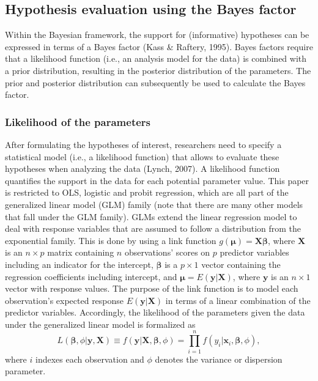 \documentclass[
]{interact}
\begin{document}
\hypertarget{hypothesis-evaluation-using-the-bayes-factor}{%
  \subsection{Hypothesis evaluation using the Bayes
    factor}\label{hypothesis-evaluation-using-the-bayes-factor}}

Within the Bayesian framework, the support for (informative) hypotheses
can be expressed in terms of a Bayes factor (Kass \& Raftery, 1995).
Bayes factors require that a likelihood function (i.e., an analysis
                                                  model for the data) is combined with a prior distribution, resulting in
the posterior distribution of the parameters. The prior and posterior
distribution can subsequently be used to calculate the Bayes factor.

\hypertarget{likelihood-of-the-parameters}{%
  \subsubsection{Likelihood of the
    parameters}\label{likelihood-of-the-parameters}}

After formulating the hypotheses of interest, researchers need to
specify a statistical model (i.e., a likelihood function) that allows to
evaluate these hypotheses when analyzing the data (Lynch, 2007). A
likelihood function quantifies the support in the data for each
potential parameter value. This paper is restricted to OLS, logistic and
probit regression, which are all part of the generalized linear model
(GLM) family (note that there are many other models that fall under the
              GLM family). GLMs extend the linear regression model to deal with
response variables that are assumed to follow a distribution from the
exponential family. This is done by using a link function
\(g(\boldsymbol{\mu}) = \boldsymbol{X} \boldsymbol{\beta}\), where
\(\boldsymbol{X}\) is an \(n \times p\) matrix containing \(n\)
observations' scores on \(p\) predictor variables including an indicator
for the intercept, \(\boldsymbol{\beta}\) is a \(p \times 1\) vector
containing the regression coefficients including intercept, and
\(\boldsymbol{\mu} = E(\boldsymbol{y}|\boldsymbol{X})\), where
\(\boldsymbol{y}\) is an \(n \times 1\) vector with response values. The
purpose of the link function is to model each observation's expected
response \(E(\boldsymbol{y}|\boldsymbol{X})\) in terms of a linear
combination of the predictor variables. Accordingly, the likelihood of
the parameters given the data under the generalized linear model is
formalized as \[
  L(\boldsymbol{\beta}, \phi| \boldsymbol{y}, \boldsymbol{X}) \equiv 
  f(\boldsymbol{y}|\boldsymbol{X}, \boldsymbol{\beta}, \phi) = 
    \prod^n_{i=1} f(y_i|\boldsymbol{x}_i, \boldsymbol{\beta}, \phi),
  \] where \(i\) indexes each observation and \(\phi\) denotes the
variance or dispersion parameter.
\end{document}
